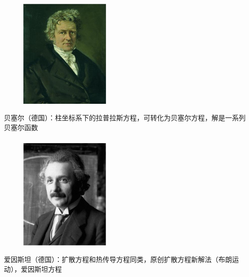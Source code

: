 \begin{frame}
	\frametitle{}
	\begin{center}
		\begin{figure}
			\includegraphics[width=4.5cm]{figs/fig1-3-6.png}	
		\end{figure}
	\end{center}
	{贝塞尔（德国）：柱坐标系下的拉普拉斯方程，可转化为贝塞尔方程，解是一系列贝塞尔函数}
\end{frame}

\begin{frame}
	\frametitle{}
	\begin{center}
		\begin{figure}
			\includegraphics[width=4.5cm]{figs/fig1-3-8.png}	
		\end{figure}
	\end{center}
	{爱因斯坦（德国）：扩散方程和热传导方程同类，原创扩散方程新解法（布朗运动），爱因斯坦方程}
\end{frame}

